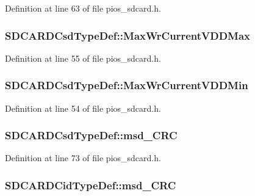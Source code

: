Definition at line 63 of file pios\-\_\-sdcard.\-h.

\hypertarget{group___p_i_o_s___s_d_c_a_r_d_gab98289ea1b8bc4b5e7fee1820487c07c}{
\subsubsection[{Max\-Wr\-Current\-V\-D\-D\-Max}]{ S\-D\-C\-A\-R\-D\-Csd\-Type\-Def\-::\-Max\-Wr\-Current\-V\-D\-D\-Max}}\label{group___p_i_o_s___s_d_c_a_r_d_gab98289ea1b8bc4b5e7fee1820487c07c}


Definition at line 55 of file pios\-\_\-sdcard.\-h.

\hypertarget{group___p_i_o_s___s_d_c_a_r_d_ga592f9aec07e72eed97e1f28155f23ab4}{
\subsubsection[{Max\-Wr\-Current\-V\-D\-D\-Min}]{ S\-D\-C\-A\-R\-D\-Csd\-Type\-Def\-::\-Max\-Wr\-Current\-V\-D\-D\-Min}}\label{group___p_i_o_s___s_d_c_a_r_d_ga592f9aec07e72eed97e1f28155f23ab4}


Definition at line 54 of file pios\-\_\-sdcard.\-h.

\hypertarget{group___p_i_o_s___s_d_c_a_r_d_ga653812c0595db0ef3eddae3dbf409b87}{
\subsubsection[{msd\-\_\-\-C\-R\-C}]{ S\-D\-C\-A\-R\-D\-Csd\-Type\-Def\-::msd\-\_\-\-C\-R\-C}}\label{group___p_i_o_s___s_d_c_a_r_d_ga653812c0595db0ef3eddae3dbf409b87}


Definition at line 73 of file pios\-\_\-sdcard.\-h.

\hypertarget{group___p_i_o_s___s_d_c_a_r_d_gaeafc9f7dae979dcf639b88246bbe29b6}{
\subsubsection[{msd\-\_\-\-C\-R\-C}]{ S\-D\-C\-A\-R\-D\-Cid\-Type\-Def\-::msd\-\_\-\-C\-R\-C}}\label{group___p_i_o_s___s_d_c_a_r_d_gaeafc9f7dae979dcf639b88246bbe29b6}


